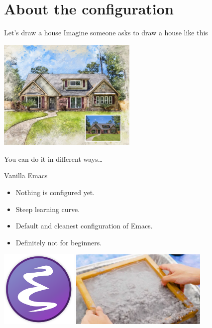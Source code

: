 \documentclass[presentation]{beamer}
\begin{document}
\section{About the configuration}
\label{sec:org759eaef}

\begin{frame}[label={sec:org9c8f5e9}]{Let's draw a house}
Imagine someone asks to draw a house like this
\begin{center}
\includegraphics[width=0.5\textwidth]{./house_model.png}
\end{center}

You can do it in different ways\ldots{}
\end{frame}

\begin{frame}[label={sec:orge920835}]{Vanilla Emacs}
\begin{itemize}
\item Nothing is configured yet.
\item Steep learning curve.
\item Default and cleanest configuration of Emacs.
\item Definitely not for beginners.
\end{itemize}

\begin{center}
\includegraphics[height=10em]{./emacs.png}
\includegraphics[height=10em]{./paper.png}
\end{center}
\end{frame}
\end{document}
